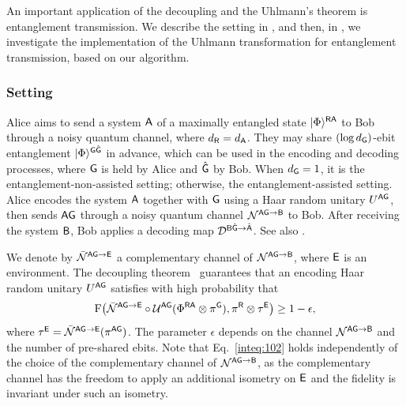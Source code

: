 An important application of the decoupling and the Uhlmann's theorem is entanglement transmission.
We describe the setting in , and then, in , we investigate the implementation of the Uhlmann transformation for entanglement transmission, based on our algorithm.




\subsubsection{Setting}
\label{seq:setting of ent transmission}

Alice aims to send a system ${\mathsf{A}}$ of a maximally entangled state $|\Phi\rangle^{{\mathsf{R}}{\mathsf{A}}}$ to Bob through a noisy quantum channel, where $d_{\mathsf{R}} = d_{\mathsf{A}}$.
They may share $(\log{d_{\mathsf{G}}})$-ebit entanglement $|\Phi\rangle^{{\mathsf{G}}\hat{{\mathsf{G}}}}$ in advance, which can be used in the encoding and decoding processes, where ${\mathsf{G}}$ is held by Alice and $\hat{{\mathsf{G}}}$ by Bob.
When $d_{\mathsf{G}}=1$, it is the entanglement-non-assisted setting; otherwise, the entanglement-assisted setting.
Alice encodes the system ${\mathsf{A}}$ together with ${\mathsf{G}}$ using a Haar random unitary $U^{{\mathsf{A}}{\mathsf{G}}}$, then sends ${\mathsf{A}}{\mathsf{G}}$ through a noisy quantum channel ${\mathcal{N}}^{{\mathsf{A}}{\mathsf{G}}\rightarrow{\mathsf{B}}}$ to Bob.
After receiving the system ${\mathsf{B}}$, Bob applies a decoding map ${\mathcal{D}}^{{\mathsf{B}}\hat{{\mathsf{G}}}\rightarrow\hat{{\mathsf{A}}}}$.
See also .


We denote by $\bar{{\mathcal{N}}}^{{\mathsf{A}}{\mathsf{G}}\rightarrow{\mathsf{E}}}$ a complementary channel of ${\mathcal{N}}^{{\mathsf{A}}{\mathsf{G}}\rightarrow{\mathsf{B}}}$, where ${\mathsf{E}}$ is an environment.
The decoupling theorem~\cite{dupuis2014one} guarantees that an encoding Haar random unitary $U^{{\mathsf{A}}{\mathsf{G}}}$ satisfies with high probability that 
\begin{align}
\label{inteq:102}
    {\mathrm{F}}\big(\bar{{\mathcal{N}}}^{{\mathsf{A}}{\mathsf{G}}\rightarrow{\mathsf{E}}}\circ{\mathcal{U}}^{{\mathsf{A}}{\mathsf{G}}}(\Phi^{{\mathsf{R}}{\mathsf{A}}} \otimes \pi^{\mathsf{G}}), \pi^{\mathsf{R}} \otimes \tau^{\mathsf{E}}\big) \geq 1 - \epsilon,
\end{align}
where $\tau^{\mathsf{E}} = \bar{{\mathcal{N}}}^{{\mathsf{A}}{\mathsf{G}}\rightarrow{\mathsf{E}}}(\pi^{{\mathsf{A}}{\mathsf{G}}})$.
The parameter $\epsilon$ depends on the channel ${\mathcal{N}}^{{\mathsf{A}}{\mathsf{G}}\rightarrow{\mathsf{B}}}$ and the number of pre-shared ebits.
Note that Eq.~\eqref{inteq:102} holds independently of the choice of the complementary channel of ${\mathcal{N}}^{{\mathsf{A}}{\mathsf{G}}\rightarrow{\mathsf{B}}}$, as the complementary channel has the freedom to apply an additional isometry on ${\mathsf{E}}$ and the fidelity is invariant under such an isometry.



